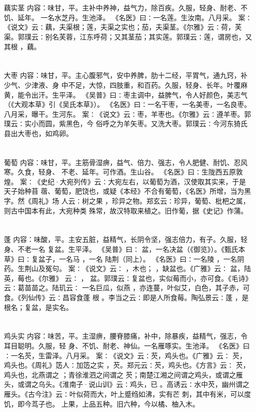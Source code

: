 \documentclass[12pt,UTF8]{ctexbook}
\begin{document}
\chapter{}藕实茎
内容：味甘，平。主补中养神，益气力，除百疾。久服，轻身、耐老、不饥、延年。 
一名水芝丹。生池泽。 
《名医》曰∶一名莲。生汝南。八月采。 
案∶《说文》云∶藕，夫渠根；莲，夫渠之实也；茄，夫渠茎。《尔雅》云∶荷，芙 
渠。郭璞云∶别名芙蓉，江东呼荷；又其茎茄；其实莲。郭璞云∶莲，谓房也，又其根 
，藕。 


\chapter{}大枣
内容：味甘，平。主心腹邪气，安中养脾，肋十二经，平胃气，通九窍，补少气、少津液、身 
中不足，大惊，四肢重，和百药。久服，轻身、长年。叶覆麻黄，能令出汗。生平泽。 
《吴普》曰∶枣主调中，益脾气，令人好颜色，美志气（《大观本草》引《吴氏本草》）。 
《名医》曰∶一名干枣，一名美枣，一名良枣。八月采，曝干。生河东。 
案∶《说文》云∶枣，羊枣也。《尔雅》云∶遵羊枣。郭璞云∶实小而圆，紫黑色，今 
俗呼之为羊矢枣。又洗大枣。郭璞云∶今河东猗氏县出大枣也，如鸡卵。 


\chapter{}葡萄
内容：味甘，平。主筋骨湿痹，益气、倍力、强志，令人肥健、耐饥、忍风寒。久食，轻身、 
不老、延年。可作酒。生山谷。 
《名医》曰∶生陇西五原敦煌。 
案∶《史纪·大宛列传》云∶大宛左右，以葡萄为酒，汉使取其实来，于是天子始种苜 
蓿、葡萄，肥饶也，或疑《本经》不合有葡萄，《名医》所增，当为黑字。然《周礼》场 
人云∶树之果 ，珍异之物。郑玄云∶珍异，葡萄、枇杷之属，则古中国本有此，大宛种类 
殊常，故汉特取来植之。旧作葡，据《史记》作蒲。 


\chapter{}蓬
内容：味酸，平。主安五脏，益精气，长阴令坚，强志倍力，有子。久服，轻身、不老一名 
复盆。生平泽。 
《吴普》曰∶ 盆，一名决盆（《御览》）。《甄氏本草》曰∶复盆子，一名马 ，一名 
陆荆（同上）。 
《名医》曰∶一名陵 ，一名阴药。生荆山及冤句。 
案∶《说文》云∶ ，木也； ，缺盆也。《广雅》云∶ 盆，陆英，莓也。《尔雅》 
云∶ ， 盆。郭璞云∶复盆也，实似莓而小，亦可食。《毛诗》云∶葛苗苗之。陆玑云∶ 
一名巨瓜，似燕 ，亦连蔓，叶似艾，白色，其子赤，可食。《列仙传》云∶昌容食蓬 根 
。李当之云∶即是人所食莓。陶弘景云∶蓬 ，是根名；复盆，是实名。 


\chapter{}鸡头实
内容：味苦，平。主湿痹，腰脊膝痛，补中，除暴疾，益精气，强志，令耳目聪明。久服，轻 
身、不饥、耐老、神仙。一名雁啄实。生池泽。 
《名医》曰∶一名芡，生雷泽。八月采。 
案∶《说文》云∶芡，鸡头也。《广雅》云∶ 芡，鸡头也。《周礼》笾人∶加笾之实 
，芡。郑元云∶芡，鸡头也。《方言》云∶ 芡，鸡头也，北燕谓之 ；青徐淮泗之间谓之 
芡；南楚江湘之间谓之鸡头，或谓之雁头，或谓之乌头。《淮南子·说山训》云∶鸡头，已 
。高诱云∶水中芡，幽州谓之雁头。《古今注》云∶叶似荷而大，叶上蹙绉如沸，实有芒 
刺，其中有米，可以度饥，即今茑子也。 
上果，上品五种。旧六种，今以橘、柚入木。 
\end{document}
